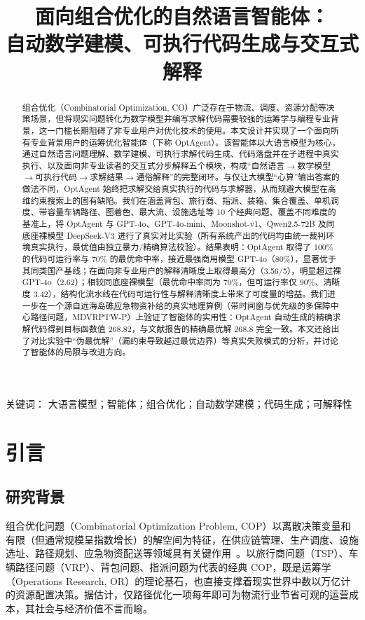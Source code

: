 \documentclass[11pt]{article}
\title{面向组合优化的自然语言智能体：\\ 自动数学建模、可执行代码生成与交互式解释}
\author{}
\date{}
\begin{document}
\maketitle

\begin{abstract}
组合优化（Combinatorial Optimization, CO）广泛存在于物流、调度、资源分配等决策场景，但将现实问题转化为数学模型并编写求解代码需要较强的运筹学与编程专业背景，这一门槛长期阻碍了非专业用户对优化技术的使用。本文设计并实现了一个面向所有专业背景用户的运筹优化智能体（下称 OptAgent）。该智能体以大语言模型为核心，通过自然语言问题理解、数学建模、可执行求解代码生成、代码落盘并在子进程中真实执行、以及面向非专业读者的交互式分步解释五个模块，构成“自然语言$\rightarrow$数学模型$\rightarrow$可执行代码$\rightarrow$求解结果$\rightarrow$通俗解释”的完整闭环。与仅让大模型“心算”输出答案的做法不同，OptAgent 始终把求解交给真实执行的代码与求解器，从而规避大模型在高维约束搜索上的固有缺陷。我们在涵盖背包、旅行商、指派、装箱、集合覆盖、单机调度、带容量车辆路径、图着色、最大流、设施选址等 10 个经典问题、覆盖不同难度的基准上，将 OptAgent 与 GPT-4o、GPT-4o-mini、Moonshot-v1、Qwen2.5-72B 及同底座裸模型 DeepSeek-V3 进行了真实对比实验（所有系统产出的代码均由统一裁判环境真实执行，最优值由独立暴力/精确算法校验）。结果表明：OptAgent 取得了 100\% 的代码可运行率与 70\% 的最优命中率，接近最强商用模型 GPT-4o（80\%），显著优于其同类国产基线；在面向非专业用户的解释清晰度上取得最高分（3.56/5），明显超过裸 GPT-4o（2.62）；相较同底座裸模型（最优命中率同为 70\%，但可运行率仅 90\%、清晰度 3.42），结构化流水线在代码可运行性与解释清晰度上带来了可度量的增益。我们进一步在一个源自远海岛礁应急物资补给的真实地理算例（带时间窗与优先级的多保障中心路径问题，MDVRPTW-P）上验证了智能体的实用性：OptAgent 自动生成的精确求解代码得到目标函数值 268.82，与文献报告的精确最优解 268.8 完全一致。本文还给出了对比实验中“伪最优解”（漏约束导致越过最优边界）等真实失败模式的分析，并讨论了智能体的局限与改进方向。
\end{abstract}

关键词： 大语言模型；智能体；组合优化；自动数学建模；代码生成；可解释性

\section{引言}

\subsection{研究背景}
组合优化问题（Combinatorial Optimization Problem, COP）以离散决策变量和有限（但通常规模呈指数增长）的解空间为特征，在供应链管理、生产调度、设施选址、路径规划、应急物资配送等领域具有关键作用~\cite{daros2026survey}。以旅行商问题（TSP）、车辆路径问题（VRP）、背包问题、指派问题为代表的经典 COP，既是运筹学（Operations Research, OR）的理论基石，也直接支撑着现实世界中数以万亿计的资源配置决策。据估计，仅路径优化一项每年即可为物流行业节省可观的运营成本，其社会与经济价值不言而喻。
\end{document}
